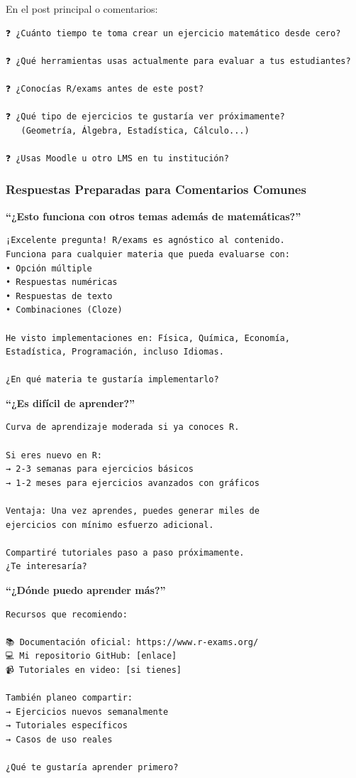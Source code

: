 \documentclass[
]{article}
\begin{document}
En el post principal o comentarios:

\begin{verbatim}
❓ ¿Cuánto tiempo te toma crear un ejercicio matemático desde cero?

❓ ¿Qué herramientas usas actualmente para evaluar a tus estudiantes?

❓ ¿Conocías R/exams antes de este post?

❓ ¿Qué tipo de ejercicios te gustaría ver próximamente?
   (Geometría, Álgebra, Estadística, Cálculo...)

❓ ¿Usas Moodle u otro LMS en tu institución?
\end{verbatim}

\subsubsection{Respuestas Preparadas para Comentarios
Comunes}\label{respuestas-preparadas-para-comentarios-comunes}

\textbf{``¿Esto funciona con otros temas además de matemáticas?''}

\begin{verbatim}
¡Excelente pregunta! R/exams es agnóstico al contenido.
Funciona para cualquier materia que pueda evaluarse con:
• Opción múltiple
• Respuestas numéricas
• Respuestas de texto
• Combinaciones (Cloze)

He visto implementaciones en: Física, Química, Economía,
Estadística, Programación, incluso Idiomas.

¿En qué materia te gustaría implementarlo?
\end{verbatim}

\textbf{``¿Es difícil de aprender?''}

\begin{verbatim}
Curva de aprendizaje moderada si ya conoces R.

Si eres nuevo en R:
→ 2-3 semanas para ejercicios básicos
→ 1-2 meses para ejercicios avanzados con gráficos

Ventaja: Una vez aprendes, puedes generar miles de
ejercicios con mínimo esfuerzo adicional.

Compartiré tutoriales paso a paso próximamente.
¿Te interesaría?
\end{verbatim}

\textbf{``¿Dónde puedo aprender más?''}

\begin{verbatim}
Recursos que recomiendo:

📚 Documentación oficial: https://www.r-exams.org/
💻 Mi repositorio GitHub: [enlace]
📹 Tutoriales en video: [si tienes]

También planeo compartir:
→ Ejercicios nuevos semanalmente
→ Tutoriales específicos
→ Casos de uso reales

¿Qué te gustaría aprender primero?
\end{verbatim}
\end{document}
